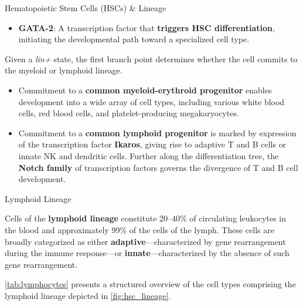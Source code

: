 \begin{core}[label=core:hsc]{Hematopoietic Stem Cells (HSCs) \& Lineage}
\begin{itemize}
      \item \textbf{GATA-2}: A transcription factor that \textbf{triggers HSC differentiation}, initiating the developmental path toward a specialized cell type.

    \end{itemize}

    Given a \textit{lin+} state, the first branch point determines whether the cell commits to the myeloid or lymphoid lineage.

    \begin{itemize}

      \item Commitment to a \textbf{common myeloid-erythroid progenitor} enables development into a wide array of cell types, including various white blood cells, red blood cells, and platelet-producing megakaryocytes.

      \item Commitment to a \textbf{common lymphoid progenitor} is marked by expression of the transcription factor \textbf{Ikaros}, giving rise to adaptive T and B cells or innate NK and dendritic cells. Further along the differentiation tree, the \textbf{Notch family} of transcription factors governs the divergence of T and B cell development.

    \end{itemize}

  \end{core}

  \begin{core}{Lymphoid Lineage}

    Cells of the \textbf{lymphoid lineage} constitute 20--40\% of circulating leukocytes in the blood and approximately 99\% of the cells of the lymph. These cells are broadly categorized as either \textbf{adaptive}---characterized by gene rearrangement during the immune response---or \textbf{innate}---characterized by the absence of such gene rearrangement.

    \autoref{tab:lymphocytes} presents a structured overview of the cell types comprising the lymphoid lineage depicted in \autoref{fig:hsc_lineage}.

  \end{core}

